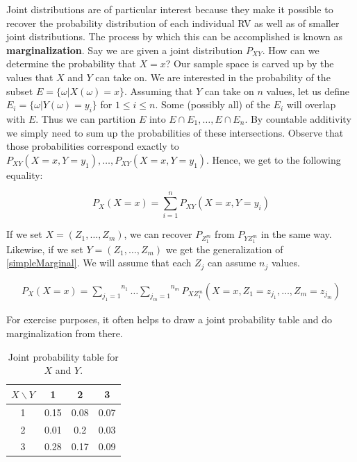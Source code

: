 \documentclass[a4paper,11pt,leqno]{report}
\begin{document}
Joint distributions are of particular interest because they make it possible to recover the probability distribution of each individual
RV as well as of smaller joint distributions. The process by which this can be accomplished is known as \textbf{marginalization}. Say
we are given a joint distribution $ P_{XY} $. How can we determine the probability that $ X=x $? Our sample space is carved
up by the values that $ X $ and $ Y $ can take on. We are interested in the probability of the subset $ E = \{\omega|X(\omega)=x\} $.
Assuming that $ Y $ can take on $ n $ values, let us define $ E_{i} = \{\omega| Y(\omega) = y_{i}\} $ for $ 1 \leq i \leq n $.
Some (possibly all) of the $ E_{i} $ will overlap with $ E $. Thus we can partition $ E $ into $ E\cap E_{1}, \ldots, E \cap E_{n} $.
By countable additivity we simply need to sum up the probabilities of these intersections. Observe that those probabilities
correspond exactly to $ P_{XY}(X=x,Y=y_{1}), \ldots, P_{XY}(X=x,Y=y_{1}) $. Hence, we get to the following equality:

\begin{equation} \label{simpleMarginal}
P_{X}(X=x) = \overset{n}{\underset{i=1}{\sum}} P_{XY}(X=x,Y=y_{i}) 
\end{equation}

If we set $ X = (Z_{1}, \ldots, Z_{m}) $, we can recover $ P_{Z_{1}^{m}} $ from $ P_{YZ_{1}^{m}} $ in the same way. Likewise,
if we set $ Y = (Z_{1}, \ldots, Z_{m}) $ we get the generalization of \ref{simpleMarginal}. We will assume that each $ Z_{j} $
can assume $ n_{j} $ values.

\begin{align}
P_{X}(X=x) = \overset{n_{1}}{\underset{j_{1}=1}{\sum}}\ldots \overset{n_{m}}{\underset{j_{m}=1}{\sum}} 
P_{XZ_{1}^{m}}(X=x,Z_{1}=z_{j_{1}}, \ldots, Z_{m}=z_{j_{m}})
\end{align}

For exercise purposes, it often helps to draw a joint probability table and do marginalization from there.

\begin{table}
\center
\begin{tabular}{|c|c|c|c|}
\hline
$X\backslash Y$	& 1		& 2		& 3		\\
\hline
1				& 0.15	& 0.08	& 0.07	\\
2				& 0.01	& 0.2	& 0.03	\\	
3				& 0.28	& 0.17	& 0.09	\\
\hline
\end{tabular}
\caption{Joint probability table for $ X $ and $ Y $.}
\label{jointTable}
\end{table}
\end{document}

